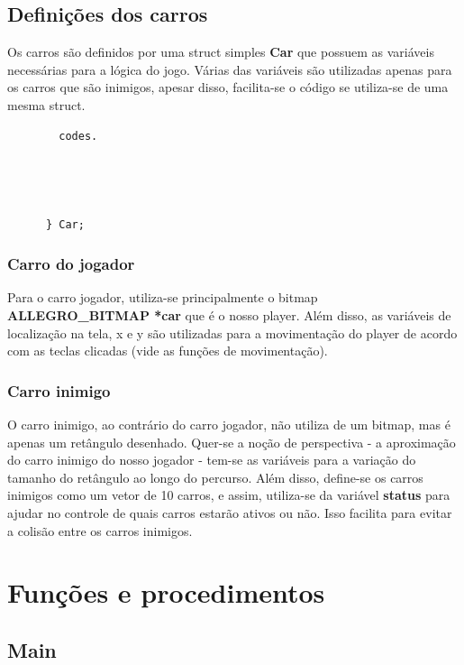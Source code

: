 \documentclass[a4paper]{article}
\begin{document}
\subsection{Definições dos carros}
Os carros são definidos por uma struct simples \textbf{Car} que possuem as variáveis necessárias para a lógica do jogo. Várias das variáveis são utilizadas apenas para os carros que são inimigos, apesar disso, facilita-se o código se utiliza-se de uma mesma struct.
	\begin{lstlisting}
    	codes.




      } Car;

    \end{lstlisting}


\subsubsection{Carro do jogador}
	Para o carro jogador, utiliza-se principalmente o bitmap \textbf{ALLEGRO\_BITMAP *car} que é o nosso player. Além disso, as variáveis de localização na tela, x e y são utilizadas para a movimentação do player de acordo com as teclas clicadas (vide as funções de movimentação).
\subsubsection{Carro inimigo}
	O carro inimigo, ao contrário do carro jogador, não utiliza de um bitmap, mas é apenas um retângulo desenhado. Quer-se a noção de perspectiva - a aproximação do carro inimigo do nosso jogador - tem-se as variáveis para a variação do tamanho do retângulo ao longo do percurso. Além disso, define-se os carros inimigos como um vetor de 10 carros, e assim, utiliza-se da variável \textbf{status} para ajudar no controle de quais carros estarão ativos ou não. Isso facilita para evitar a colisão entre os carros inimigos.

\section{Funções e procedimentos}
\subsection{Main}
\end{document}
